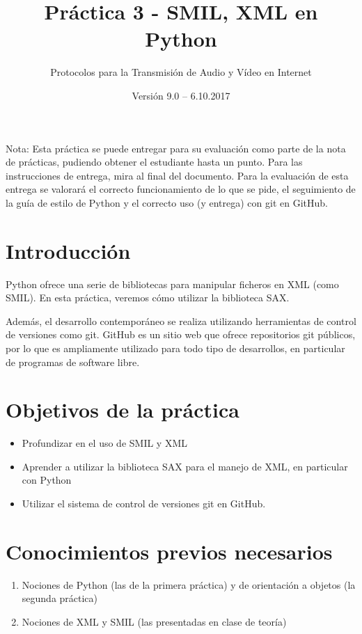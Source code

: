 \documentclass[11pt,a4paper]{article}
\begin{document}
\title{Práctica 3 - SMIL, XML en Python}
\author{Protocolos para la Transmisión de Audio y Vídeo en Internet}
\date{Versión 9.0 – 6.10.2017}


\maketitle


Nota: Esta práctica se puede entregar para su evaluación como parte de la nota de prácticas, pudiendo obtener el estudiante hasta un punto. Para las instrucciones de entrega, mira al final del documento. Para la evaluación de esta entrega se valorará el correcto funcionamiento de lo que se pide, el seguimiento de la guía de estilo de Python y el correcto uso (y entrega) con git en GitHub.

\section{Introducción}

Python ofrece una serie de bibliotecas para manipular ficheros en XML (como SMIL). En esta práctica, veremos cómo utilizar la biblioteca SAX.

Además, el desarrollo contemporáneo se realiza utilizando herramientas de control de versiones como git. GitHub es un sitio web que ofrece repositorios git públicos, por lo que es ampliamente utilizado para todo tipo de desarrollos, en particular de programas de software libre.

\section{Objetivos de la práctica}

\begin{itemize}
  \item Profundizar en el uso de SMIL y XML
  \item Aprender a utilizar la biblioteca SAX para el manejo de XML, en particular con Python
  \item Utilizar el sistema de control de versiones git en GitHub.
\end{itemize}

\section{Conocimientos previos necesarios}

\begin{enumerate}
  \item Nociones de Python (las de la primera práctica) y de orientación a objetos (la segunda práctica)
  \item Nociones de XML y SMIL (las presentadas en clase de teoría)
\end{enumerate}
\end{document}
